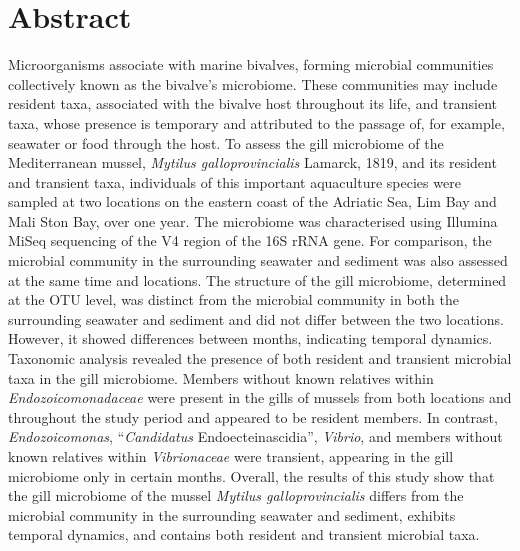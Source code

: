 \documentclass[
  12 pt,
]{article}
\begin{document}
\linenumbers


\setlength\parindent{24pt}

\newpage

\section{Abstract}\label{abstract}

Microorganisms associate with marine bivalves, forming microbial communities collectively known as the bivalve's microbiome. These communities may include resident taxa, associated with the bivalve host throughout its life, and transient taxa, whose presence is temporary and attributed to the passage of, for example, seawater or food through the host. To assess the gill microbiome of the Mediterranean mussel, \emph{Mytilus galloprovincialis} Lamarck, 1819, and its resident and transient taxa, individuals of this important aquaculture species were sampled at two locations on the eastern coast of the Adriatic Sea, Lim Bay and Mali Ston Bay, over one year. The microbiome was characterised using Illumina MiSeq sequencing of the V4 region of the 16S rRNA gene. For comparison, the microbial community in the surrounding seawater and sediment was also assessed at the same time and locations. The structure of the gill microbiome, determined at the OTU level, was distinct from the microbial community in both the surrounding seawater and sediment and did not differ between the two locations. However, it showed differences between months, indicating temporal dynamics. Taxonomic analysis revealed the presence of both resident and transient microbial taxa in the gill microbiome. Members without known relatives within \emph{Endozoicomonadaceae} were present in the gills of mussels from both locations and throughout the study period and appeared to be resident members. In contrast, \emph{Endozoicomonas}, ``\emph{Candidatus} Endoecteinascidia'', \emph{Vibrio}, and members without known relatives within \emph{Vibrionaceae} were transient, appearing in the gill microbiome only in certain months. Overall, the results of this study show that the gill microbiome of the mussel \emph{Mytilus galloprovincialis} differs from the microbial community in the surrounding seawater and sediment, exhibits temporal dynamics, and contains both resident and transient microbial taxa.
\end{document}
